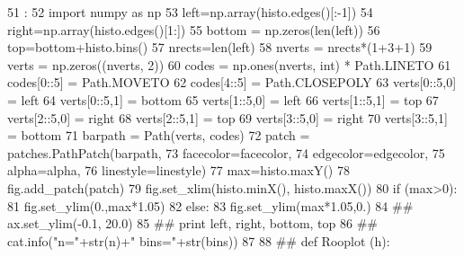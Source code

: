 \begin{DoxyCode}
51                            :
52         import numpy as np
53         left=np.array(histo.edges()[:-1])
54         right=np.array(histo.edges()[1:])
55         bottom = np.zeros(len(left))
56         top=bottom+histo.bins()
57         nrects=len(left)
58         nverts = nrects*(1+3+1)
59         verts = np.zeros((nverts, 2))
60         codes = np.ones(nverts, int) * Path.LINETO
61         codes[0::5] = Path.MOVETO
62         codes[4::5] = Path.CLOSEPOLY
63         verts[0::5,0] = left
64         verts[0::5,1] = bottom
65         verts[1::5,0] = left
66         verts[1::5,1] = top
67         verts[2::5,0] = right
68         verts[2::5,1] = top
69         verts[3::5,0] = right
70         verts[3::5,1] = bottom
71         barpath = Path(verts, codes)
72         patch = patches.PathPatch(barpath,
73                                   facecolor=facecolor,
74                                   edgecolor=edgecolor,
75                                   alpha=alpha,
76                                   linestyle=linestyle)
77         max=histo.maxY()
78         fig.add_patch(patch)
79         fig.set_xlim(histo.minX(), histo.maxX())
80         if (max>0):
81                 fig.set_ylim(0.,max*1.05)
82         else:
83                 fig.set_ylim(max*1.05,0.)
84                 ##     ax.set_ylim(-0.1, 20.0)
85                 ##              print left, right, bottom, top
86                 ##              cat.info("n="+str(n)+" bins="+str(bins))
87 
88 
## def Rooplot (h):
\end{DoxyCode}
